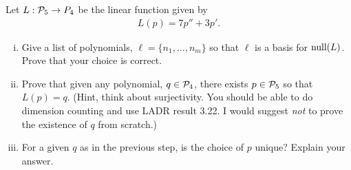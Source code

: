 \begin{question}
    \normalfont




    Let $L:\P_5\to P_4$ be the linear function given by
    \begin{align*}
        L(p) = 7p'' + 3p'.
    \end{align*}
    \begin{enumerate}[(i)]
        \item Give a list of polynomials, $\ell = \{n_1,\dots, n_m\}$ so that $\ell$ is a basis for $\NullLA(L)$.  Prove that your choice is correct.


        \item Prove that given any polynomial, $q\in \P_4$, there exists $p\in\P_5$ so that $L(p)=q$.  (Hint, think about surjectivity. You should be able to do dimension counting and use LADR result 3.22.  I would suggest \emph{not} to prove the existence of $q$ from scratch.)

        \item For a given $q$ as in the previous step, is the choice of $p$ unique?  Explain your answer.

    \end{enumerate}
\end{question}

